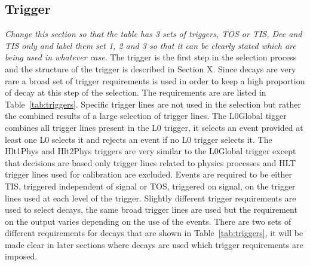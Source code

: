 \subsection{Trigger}
\label{sec:triggerRequirements}
{\it Change this section so that the table has 3 sets of triggers, TOS or TIS, Dec and TIS only and label them set 1, 2 and 3 so that it can be clearly stated which are being used in whatever case}.
The trigger is the first step in the selection process and the structure of the trigger is described in Section X. Since \bsmumu decays are very rare a broad set of trigger requirements is used in order to keep a high proportion of \bsmumu decay at this step of the selection. The requirements are are listed in Table~\ref{tab:triggers}.  Specific trigger lines are not used in the selection but rather the combined results of a large selection of trigger lines. The L0Global tigger combines all trigger lines present in the L0 trigger, it selects an event provided at least one L0 selects it and rejects an event if no L0 trigger selects it. The Hlt1Phys and Hlt2Phys triggers are very similar to the L0Global trigger except that decisions are based only trigger lines related to physics processes and HLT trigger lines used for calibration are excluded. Events are required to be either TIS, triggered independent of signal or TOS, triggered on signal, on the trigger lines used at each level of the trigger.
Slightly different trigger requirements are used to select \bhh decays, the same broad trigger lines are used but the requirement on the output varies depending on the use of the \bhh events. There are two sets of different requirements for \bhh decays that are shown in Table~\ref{tab:triggers}, it will be made clear in later sections where \bhh decays are used which trigger requirements are imposed. 





